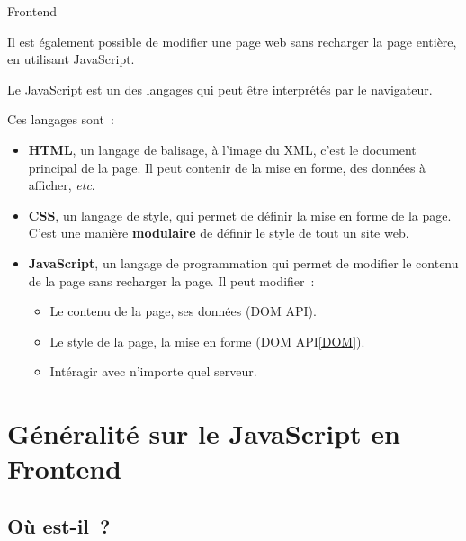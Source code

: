 \documentclass{beamer}
\begin{document}
\begin{frame}{Frontend}
    \begin{small}
        Il est également possible de modifier une page web sans recharger la page entière, en utilisant JavaScript.

        Le JavaScript est un des langages qui peut être interprétés par le navigateur.

        Ces langages sont~:
        \begin{itemize}
            \item \textbf{HTML}, un langage de balisage, à l'image du XML, c'est le document principal de la page.
                  Il peut contenir de la mise en forme, des données à afficher, \textit{etc}.
            \item \textbf{CSS}, un langage de style, qui permet de définir la mise en forme de la page.
                  C'est une manière \textbf{modulaire} de définir le style de tout un site web.
            \item \textbf{JavaScript}, un langage de programmation qui permet de modifier le contenu de la page sans recharger la page.
                  Il peut modifier~:
                  \begin{itemize}
                      \item Le contenu de la page, ses données (DOM API\footnotemark{}).
                      \item Le style de la page, la mise en forme (DOM API\cref{DOM}).
                      \item Intéragir avec n'importe quel serveur.
                  \end{itemize}
        \end{itemize}
    \end{small}
\end{frame}

\section{Généralité sur le JavaScript en Frontend}\label{sec:js-basic}

\subsection{Où est-il~?}\label{sec:where}
\end{document}
